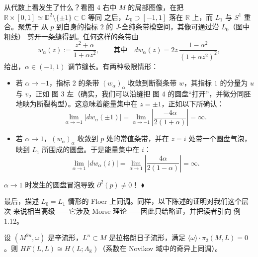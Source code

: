 从代数上看发生了什么？看图 4 右中 $M$ 的局部图像，在把
$\mathbb R\times[0,1]\simeq\mathbb D^2\setminus\{\pm1\}\subset\mathbb C$ 等同
之后，$L_0\supset[-1,1]$ 落在 $\mathbb R$ 上，而 $L_1$ 与 $S^1$ 重合。聚焦于
从 $p$ 到自身的指标 $2$ 的 $J$-全纯条带模空间，其像可通过沿 $L_0$（图中粗线）
剪开一条缝得到。任何这样的条带由
\[
w_\alpha(z):=\frac{z^2+\alpha}{1+\alpha z^2},
\qquad\text{其中}\quad
dw_\alpha(z)=2z\,\frac{1-\alpha^2}{(1+\alpha z^2)^2},
\]
给出，$\alpha\in(-1,1)$ 调节缝长。有两种极限情形：
\begin{itemize}
  \item 若 $\alpha\to-1$，指标 $2$ 的条带 $(w_\alpha)_\alpha$ 收敛到断裂条带
  $w$，其指标 $1$ 的分量为 $u$ 与 $v$，正如 图 3 左（确实，我们可以沿缝把
  图 4 的圆盘“打开”，并微分同胚地映为断裂构型）。这意味着能量集中在
  $z=\pm1$，正如以下所确认：
  \[
  \lim_{\alpha\to-1}|dw_\alpha(\pm1)|
  =\lim_{\alpha\to-1}\left|\frac{-4\alpha}{2(1+\alpha)}\right|=\infty.
  \]
  \item 若 $\alpha\to1$，$(w_\alpha)_\alpha$ 收敛到 $p$ 处的常值条带，并在
  $z=i$ 处带一个圆盘气泡，映到 $L_1$ 所围成的圆盘。于是能量集中在 $i$：
  \[
  \lim_{\alpha\to1}|dw_\alpha(i)|
  =\lim_{\alpha\to1}\left|\frac{4\alpha}{2(1-\alpha)}\right|=\infty.
  \]
\end{itemize}
$\alpha\to1$ 时发生的圆盘冒泡导致 $\partial^2(p)\neq0$！
\hfill$\blacklozenge$



最后，描述 $L_0=L_1$ 情形的 Floer 上同调。同样，以下陈述的证明对我们这个层次
来说相当高级——它涉及 Morse 理论——因此只给略证，并把读者引向 \cite{Aur13}
例 1.12。

\begin{Pro}\label{prop:5.43}
设 $(M^{2n},\omega)$ 是辛流形，$L^n\subset M$ 是拉格朗日子流形，满足
$\langle\omega\rangle\cdot\pi_2(M,L)=0$。则
$HF(L,L)\cong H(L;\Lambda_{\mathbb K})$（系数在 Novikov 域中的奇异上同调）。
\end{Pro}

